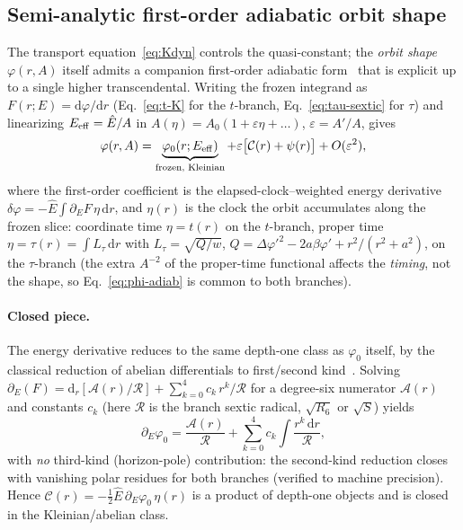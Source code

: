 \documentclass[12pt]{iopart}
\newcommand{\Ehat}{\hat E}
\newcommand{\dd}{\mathrm{d}}
\begin{document}
\subsection{Semi-analytic first-order adiabatic orbit shape}
\label{sec:adiabatic}
The transport equation~\eqref{eq:Kdyn} controls the quasi-constant; the
\emph{orbit shape} $\varphi(r,A)$ itself admits a companion first-order adiabatic
form~\cite{BornFock1928,BenderOrszag1999} that is explicit up to a single higher
transcendental. Writing the frozen integrand as
$F(r;E)=\dd\varphi/\dd r$ (Eq.~\eqref{eq:t-K} for the $t$-branch,
Eq.~\eqref{eq:tau-sextic} for $\tau$) and linearizing $E_{\rm eff}=\Ehat/A$ in
$A(\eta)=A_0(1+\varepsilon\eta+\dots)$, $\varepsilon=A'/A$, gives
\begin{equation}
    \varphi(r,A)=\underbrace{\varphi_0(r;E_{\rm eff})}_{\text{frozen, Kleinian}}
    +\varepsilon\big[\mathcal{C}(r)+\psi(r)\big]+O(\varepsilon^2),
    \label{eq:phi-adiab}
\end{equation}
where the first-order coefficient is the elapsed-clock--weighted energy
derivative $\delta\varphi=-\Ehat\!\int\!\partial_E F\,\eta\,\dd r$, and $\eta(r)$
is the clock the orbit accumulates along the frozen slice: coordinate time
$\eta=t(r)$ on the $t$-branch, proper time $\eta=\tau(r)=\int\!L_\tau\,\dd r$ with
$L_\tau=\sqrt{Q/w}$, $Q=\Delta\varphi'^2-2a\beta\varphi'+r^2/(r^2+a^2)$, on the
$\tau$-branch (the extra $A^{-2}$ of the proper-time functional affects the
\emph{timing}, not the shape, so Eq.~\eqref{eq:phi-adiab} is common to both
branches).

\paragraph{Closed piece.} The energy derivative reduces to the same depth-one
class as $\varphi_0$ itself, by the classical reduction of abelian differentials to
first/second kind~\cite{BakerAbelian1897,GriffithsHarris1978}. Solving
$\partial_E(F)=\dd_r[\mathcal{A}(r)/\mathcal{R}]
+\sum_{k=0}^{4}c_k\,r^k/\mathcal{R}$ for a degree-six numerator $\mathcal{A}(r)$
and constants $c_k$ (here $\mathcal{R}$ is the branch sextic radical, $\sqrt{R_6}$
or $\sqrt{S}$) yields
\begin{equation}
    \partial_E\varphi_0=\frac{\mathcal{A}(r)}{\mathcal{R}}
    +\sum_{k=0}^{4}c_k\!\int\!\frac{r^k\,\dd r}{\mathcal{R}},
    \label{eq:dEphi0}
\end{equation}
with \emph{no} third-kind (horizon-pole) contribution: the second-kind reduction
closes with vanishing polar residues for both branches (verified to machine
precision). Hence $\mathcal{C}(r)=-\tfrac12\Ehat\,\partial_E\varphi_0\,\eta(r)$ is
a product of depth-one objects and is closed in the Kleinian/abelian class.
\end{document}
